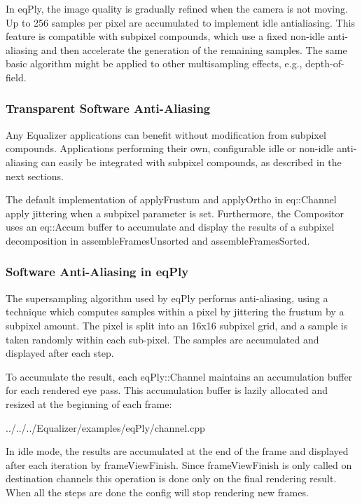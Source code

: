 \documentclass[10pt,a4]{scrartcl}
\begin{document}
In eqPly, the image quality is gradually refined when the camera is not
moving. Up to 256 samples per pixel are accumulated to implement idle
antialiasing. This feature is compatible with subpixel compounds, which use a
fixed non-idle anti-aliasing and then accelerate the generation of the remaining
samples. The same basic algorithm might be applied to other multisampling
effects, e.g., depth-of-field.

\subsubsection{Transparent Software Anti-Aliasing}

Any Equalizer applications can benefit without modification from subpixel
compounds. Applications performing their own, configurable idle or non-idle
anti-aliasing can easily be integrated with subpixel compounds, as described in
the next sections.

The default implementation of \textsf{applyFrustum} and \textsf{applyOrtho} in
\textsf{eq::Channel} apply jittering when a subpixel parameter is set.
Furthermore, the \textsf{Compositor} uses an \textsf{eq::Accum} buffer to
accumulate and display the results of a subpixel decomposition in \textsf{assembleFramesUnsorted} and \textsf{assembleFramesSorted}.

\subsubsection{Software Anti-Aliasing in eqPly}

The supersampling algorithm used by eqPly performs anti-aliasing, using a
technique which computes samples within a pixel by jittering the frustum by a
subpixel amount. The pixel is split into an 16x16 subpixel grid, and a sample is
taken randomly within each sub-pixel. The samples are accumulated and displayed
after each step.

To accumulate the result, each \textsf{eqPly::Channel} maintains an accumulation
buffer for each rendered eye pass. This accumulation buffer is lazily allocated
and resized at the beginning of each frame:

{\footnotesize
  {../../../Equalizer/examples/eqPly/channel.cpp}}

In idle mode, the results are accumulated at the end of the frame and displayed
after each iteration by \textsf{frameViewFinish}. Since \textsf{frameViewFinish}
is only called on destination channels this operation is done only on the final
rendering result. When all the steps are done the config will stop rendering new
frames.
\end{document}
